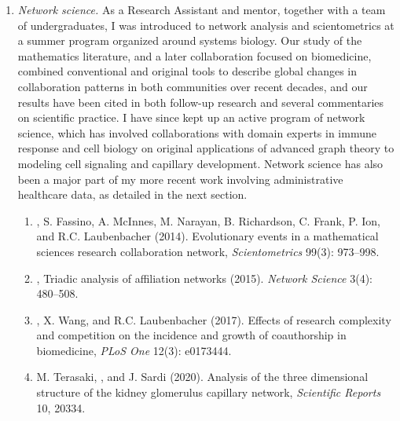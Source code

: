 \documentclass{nihbiosketch}
\begin{document}
\begin{enumerate}

\item \emph{Network science.}
As a Research Assistant and mentor, together with a team of undergraduates, I was introduced to network analysis and scientometrics at a summer program organized around systems biology.
Our study of the mathematics literature, and a later collaboration focused on biomedicine, combined conventional and original tools to describe global changes in collaboration patterns in both communities over recent decades, and our results have been cited in both follow-up research and several commentaries on scientific practice.
I have since kept up an active program of network science, which has involved collaborations with domain experts in immune response and cell biology on original applications of advanced graph theory to modeling cell signaling and capillary development.
Network science has also been a major part of my more recent work involving administrative healthcare data, as detailed in the next section.

\begin{enumerate}
\item {}, S. Fassino, A. McInnes, M. Narayan, B. Richardson, C. Frank, P. Ion, and R.C. Laubenbacher (2014). Evolutionary events in a mathematical sciences research collaboration network, \emph{Scientometrics} 99(3): 973--998.
\item {}, Triadic analysis of affiliation networks (2015). \emph{Network Science} 3(4): 480--508.
\item {}, X. Wang, and R.C. Laubenbacher (2017). Effects of research complexity and competition on the incidence and growth of coauthorship in biomedicine, \emph{PLoS One} 12(3): e0173444.
\item M. Terasaki, , and J. Sardi (2020). Analysis of the three dimensional structure of the kidney glomerulus capillary network, \emph{Scientific Reports} 10, 20334.
\end{enumerate}


\end{enumerate}
\end{document}
